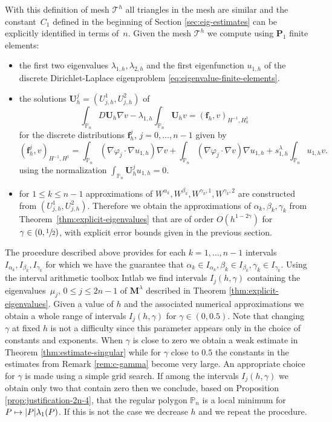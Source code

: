 \documentclass[11pt]{article}
\numberwithin{equation}{section}\newtheorem*{jepEnonce}{\jepEnonceTitle}\newenvironment{enonce*}[1]{\def\jepEnonceTitle{#1}\jepEnonce}{\endjepEnonce}\newtheorem*{conj*}{Conjecture}
\def\mto{\mathchoice{\longmapsto}{\mapsto}{\mapsto}{\mapsto}}
\theoremstyle{plain}
\theoremstyle{definition}
\newcommand{\bo}[1]{{\boldsymbol#1}}
\def\Pp{{\mathbb{P}_n}}
\let\jepOriginalSfrac\sfrac
\renewcommand{\sfrac}[2]{{\jepOriginalSfrac{#1}{#2}}}
\begin{document}
With this definition of mesh $\mathcal T^h$ all triangles in the mesh are similar and the constant~$C_1$ defined in the beginning of Section \ref{sec:eig-estimates} can be explicitly identified in terms of~$n$. Given the mesh $\mathcal T^h$ we compute using $\bo P_1$ finite elements:
\begin{itemize}
\item the first two eigenvalues $\lambda_{1,h},\lambda_{2,h}$ and the first eigenfunction $u_{1,h}$ of the discrete Dirichlet-Laplace eigenproblem \eqref{eq:eigenvalue-finite-elements}.
\item the solutions $\bo U_h^j = (U_{j,h}^1, U_{j,h}^2)$ of
\[
\int_{\Pp} D\bo U_h \nabla v-\lambda_{1,h}\int_\Pp \bo U_h v = (\bo f_h,v)_{H^{-1},H_0^1}
\]
for the discrete distributions $\bo f_h^j$, $j=0,\dots,n-1$ given by
\begin{equation*}
(\bo f_{h}^j,v)_{H^{-1},H^1} = \int_{\Pp}(\nabla \varphi_j \cdot \nabla u_{1,h})\nabla v +\int_{\Pp}(\nabla \varphi_j\cdot \nabla v)\nabla u_{1,h}+s_{1,h}^\lambda \int_\Pp u_{1,h}v.
\end{equation*}
using the normalization $\int_\Pp \bo U_h^j u_{1,h} = 0$.
\item for $1\leq k \leq n-1$ approximations of $W^{\alpha_k},W^{\beta_k},W^{\gamma_k,1},W^{\gamma_k,2}$ are constructed from $(U_{j,h}^1, U_{j,h}^2)$. Therefore we obtain the approximations of $\alpha_k,\beta_k,\gamma_k$ from Theorem~\ref{thm:explicit-eigenvalues} that are of order $O(h^{1-2\gamma})$ for $\gamma \in (0,\sfrac{1}{2})$, with explicit error bounds given in the previous section.
\end{itemize}
The procedure described above provides for each $k=1,\dots,n-1$ intervals $I_{\alpha_k}, I_{\beta_k}, I_{\gamma_k}$ for which we have the guarantee that $\alpha_k \in I_{\alpha_k},\beta_k \in I_{\beta_k}, \gamma_k \in I_{\gamma_k}$. Using the interval arithmetic toolbox Intlab \cite{intlab} we find intervals $I_j (h,\gamma)$ containing the eigenvalues~$\mu_j$, $0 \leq j \leq 2n-1$ of $\bo M^{\lambda}$ described in Theorem \ref{thm:explicit-eigenvalues}. Given a value of $h$ and the associated numerical approximations we obtain a whole range of intervals $I_j(h,\gamma)$ for $\gamma\in (0,0.5)$. Note that changing $\gamma$ at fixed $h$ is not a difficulty since this parameter appears only in the choice of constants and exponents. When $\gamma$ is close to zero we obtain a weak estimate in Theorem \ref{thm:estimate-singular} while for $\gamma$ close to $0.5$ the constants in the estimates from Remark \ref{rem:c-gamma} become very large. An appropriate choice for $\gamma$ is made using a simple grid search. If among the intervals $I_j(h,\gamma)$ we obtain only two that contain zero then we conclude, based on Proposition \ref{prop:justification-2n-4}, that the regular polygon $\Pp$ is a local minimum for $P\mto |P|\lambda_1(P)$. If this is not the case we decrease $h$ and we repeat the procedure.
\end{document}
